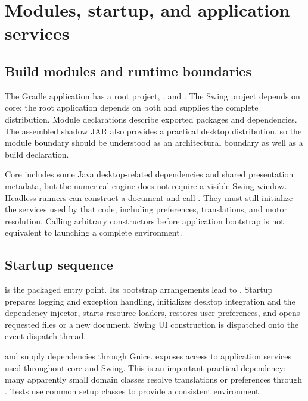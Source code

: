 \chapter{Modules, startup, and application services}\label{ch:runtime}
\section{Build modules and runtime boundaries}
The Gradle application has a root project, , and . The Swing project depends on core; the root application depends on both and supplies the complete distribution. Module declarations describe exported packages and dependencies. The assembled shadow JAR also provides a practical desktop distribution, so the module boundary should be understood as an architectural boundary as well as a build declaration.

Core includes some Java desktop-related dependencies and shared presentation metadata, but the numerical engine does not require a visible Swing window. Headless runners can construct a document and call . They must still initialize the services used by that code, including preferences, translations, and motor resolution. Calling arbitrary constructors before application bootstrap is not equivalent to launching a complete environment.

\section{Startup sequence}
 is the packaged entry point. Its bootstrap arrangements lead to . Startup prepares logging and exception handling, initializes desktop integration and the dependency injector, starts resource loaders, restores user preferences, and opens requested files or a new document. Swing UI construction is dispatched onto the event-dispatch thread.

 and  supply dependencies through Guice.  exposes access to application services used throughout core and Swing. This is an important practical dependency: many apparently small domain classes resolve translations or preferences through . Tests use common setup classes to provide a consistent environment.

